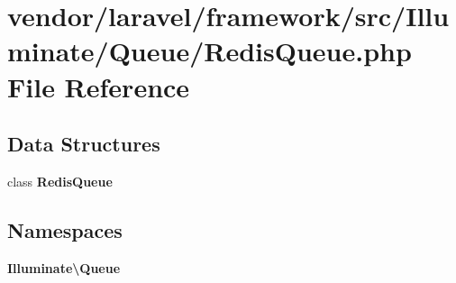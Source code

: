\section{vendor/laravel/framework/src/\+Illuminate/\+Queue/\+Redis\+Queue.php File Reference}
\label{_redis_queue_8php}
\subsection*{Data Structures}
\begin{DoxyCompactItemize}
\item 
class {\bf Redis\+Queue}
\end{DoxyCompactItemize}
\subsection*{Namespaces}
\begin{DoxyCompactItemize}
\item 
 {\bf Illuminate\textbackslash{}\+Queue}
\end{DoxyCompactItemize}
